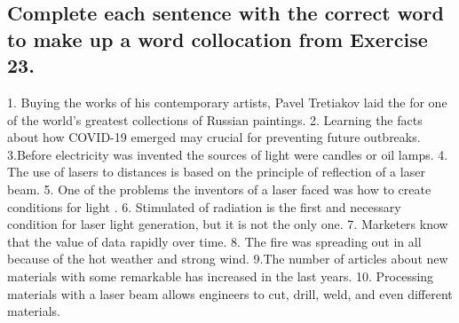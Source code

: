 \subsection*{Complete each sentence with the correct word to make up a word collocation
      from Exercise 23.}
1. Buying the works of his contemporary artists, Pavel Tretiakov laid the
\underline{\hspace{2cm}} for one of the world’s greatest collections of Russian
paintings. 2. Learning the facts about how COVID-19 emerged may \underline{\hspace{2cm}}
crucial for preventing future outbreaks. 3.Before electricity was invented the
\underline{\hspace{2cm}} sources of light were candles or oil lamps. 4. The use of
lasers to \underline{\hspace{2cm}} distances is based on the principle of reflection of
a laser beam. 5. One of the problems the inventors of a laser faced was how to create
conditions for light \underline{\hspace{2cm}}. 6. Stimulated \underline{\hspace{2cm}}
of radiation is the first and necessary condition for laser light generation, but it is
not the only one. 7. Marketers know that the value of data \underline{\hspace{2cm}}
rapidly over time. 8. The fire was spreading out in all \underline{\hspace{2cm}} because
of the hot weather and strong wind. 9.The number of articles about new materials with
some remarkable \underline{\hspace{2cm}} has increased in the last years. 10. Processing
materials with a laser beam allows engineers to cut, drill, weld, and even
\underline{\hspace{2cm}} different materials.

